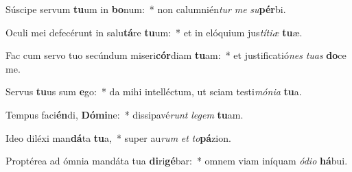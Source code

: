 \item Súscipe servum \textbf{tu}um in \textbf{bo}num:~* non calumnién\textit{tur} \textit{me} \textit{su}\textbf{pér}bi.
\item Oculi mei defecérunt in salu\textbf{tá}re \textbf{tu}um:~* et in elóquium jus\textit{tí}\textit{ti}\textit{æ} \textbf{tu}æ.
\item Fac cum servo tuo secúndum miseri\textbf{cór}diam \textbf{tu}am:~* et justificatió\textit{nes} \textit{tu}\textit{as} \textbf{do}ce me.
\item Servus \textbf{tu}us sum \textbf{e}go:~* da mihi intelléctum, ut sciam testi\textit{mó}\textit{ni}\textit{a} \textbf{tu}a.
\item Tempus faci\textbf{én}di, \textbf{Dó}\textbf{mi}ne:~* dissipavé\textit{runt} \textit{le}\textit{gem} \textbf{tu}am.
\item Ideo diléxi man\textbf{dá}ta \textbf{tu}a,~* super au\textit{rum} \textit{et} \textit{to}\textbf{pá}zion.
\item Proptérea ad ómnia mandáta tua \textbf{di}ri\textbf{gé}bar:~* omnem viam iníquam \textit{ó}\textit{di}\textit{o} \textbf{há}bui.
